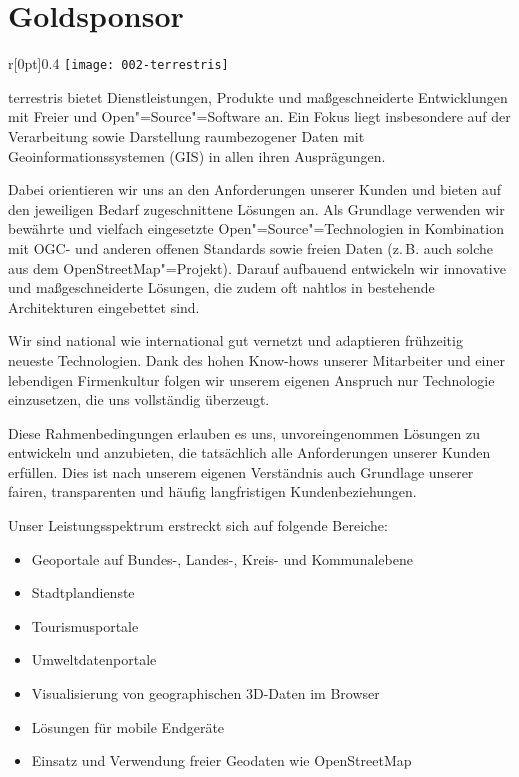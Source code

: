 \section*{Goldsponsor}
\begin{wrapfigure}[0]{r}[0pt]{0.4\textwidth}
  \centering\vspace{-6\baselineskip}
  \texttt{[image: 002-terrestris]}
\end{wrapfigure}
terrestris bietet Dienstleistungen, Produkte und maßgeschneiderte Entwicklungen mit Freier und
Open"=Source"=Software an. Ein Fokus liegt insbesondere auf der Verarbeitung sowie Darstellung
raumbezogener Daten mit Geoinformationssystemen (GIS) in allen ihren Ausprägungen.

Dabei orientieren wir uns an den Anforderungen unserer Kunden und bieten auf den jeweiligen Bedarf
zugeschnittene Lösungen an. Als Grundlage verwenden wir bewährte und vielfach eingesetzte
Open"=Source"=Technologien in Kombination mit OGC- und anderen offenen Standards sowie freien Daten
(z.\,B.
auch solche aus dem OpenStreetMap"=Projekt). Darauf aufbauend entwi\-ckeln wir innovative und
maßgeschneiderte Lösungen, die zudem oft nahtlos in bestehende Architekturen eingebettet sind.

Wir sind national wie international gut vernetzt und adaptieren frühzeitig neueste Technologien.
Dank des hohen Know-hows unserer Mitarbeiter und einer lebendigen Firmenkultur folgen wir unserem
eigenen Anspruch nur Technologie einzusetzen, die uns vollständig überzeugt. 

Diese Rahmenbedingungen erlauben es uns, unvoreingenommen Lösungen
zu entwickeln und anzubieten, die tatsächlich alle Anforderungen unserer
Kunden erfüllen. Dies ist nach unserem eigenen Verständnis auch
Grundlage unserer fairen, transparenten und häufig langfristigen Kundenbeziehungen.

Unser Leistungsspektrum erstreckt sich auf folgende Bereiche:
\vspace{-0.2\baselineskip}
\begin{itemize}
  \RaggedRight
  \setlength{\itemsep}{-0.2\baselineskip}
  \item Geoportale auf Bundes-, Landes-, Kreis- und Kommunalebene
  \item Stadtplandienste
  \item Tourismusportale
  \item Umweltdatenportale
  \item Visualisierung von geographischen 3D-Daten im Browser
  \item Lösungen für mobile Endgeräte
  \item Einsatz und Verwendung freier Geodaten wie OpenStreetMap
    \justifying
\end{itemize}
\vspace{-0.5\baselineskip}

